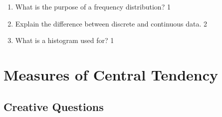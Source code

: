 \documentclass[a4paper,oneside]{book}
\begin{document}
\begin{enumerate}
\item What is the purpose of a frequency distribution? \hfill 1

\item Explain the difference between discrete and continuous data. \hfill 2

\item What is a histogram used for? \hfill 1



\end{enumerate}

\chapter{Measures of Central Tendency} 
\section{Creative Questions}
\end{document}
